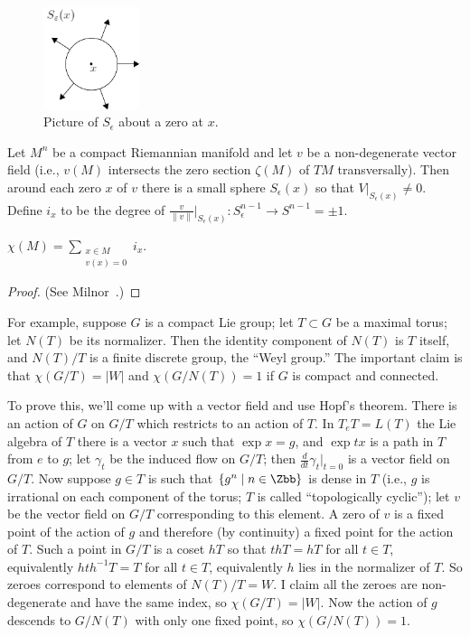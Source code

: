 \begin{figure}
\centering\includegraphics[width=0.25\textwidth]{figures/figure39.pdf}
\caption{\small Picture of $S_\epsilon$ about a zero at $x$.}
\end{figure}
Let $M^n$ be a compact Riemannian manifold and let $v$ be a non-degenerate vector field (i.e., $v(M)$ intersects the zero section $\zeta(M)$ of $TM$ transversally).  Then around each zero $x$ of $v$ there is a small sphere $S_\epsilon(x)$ so that $V|_{S_\epsilon(x)} \ne 0$.  Define $i_x$ to be the degree of $\frac{v}{\|v\|}|_{S_\epsilon(x)}: S^{n-1}_\epsilon \to S^{n-1} = \pm 1$.
\begin{thm}[Hopf]
$\chi(M) = \sum_{\substack{x \in M \\ v(x) = 0}} i_x$.
\end{thm}
\begin{proof}
(See Milnor~\cite{Milnor}.)
\end{proof}
For example, suppose $G$ is a compact Lie group; let $T \subset G$ be a maximal torus; let $N(T)$ be its normalizer.  Then the identity component of $N(T)$ is $T$ itself, and $N(T) / T$ is a finite discrete group, the ``Weyl group.''  The important claim is that $\chi(G / T) = |W|$ and $\chi(G / N(T)) = 1$ if $G$ is compact and connected.

To prove this, we'll come up with a vector field and use Hopf's theorem.  There is an action of $G$ on $G/T$ which restricts to an action of $T$.  In $T_eT = L(T)$ the Lie algebra of $T$ there is a vector $x$ such that $\exp x = g$, and $\exp tx$ is a path in $T$ from $e$ to $g$; let $\gamma_t$ be the induced flow on $G/T$; then $\frac{d}{dt} \gamma_t |_{t = 0}$ is a vector field on $G/T$.  Now suppose $g \in T$ is such that $\{g^n \mid n \in \Zbb\}$ is dense in $T$ (i.e., $g$ is irrational on each component of the torus; $T$ is called ``topologically cyclic''); let $v$ be the vector field on $G/T$ corresponding to this element.  A zero of $v$ is a fixed point of the action of $g$ and therefore (by continuity) a fixed point for the action of $T$.  Such a point in $G/T$ is a coset $hT$ so that $thT = hT$ for all $t \in T$, equivalently $hth^{-1} T = T$ for all $t \in T$, equivalently $h$ lies in the normalizer of $T$.  So zeroes correspond to elements of $N(T) / T = W$.  I claim all the zeroes are non-degenerate and have the same index, so $\chi(G/T) = |W|$.  Now the action of $g$ descends to $G/N(T)$ with only one fixed point, so $\chi(G/N(T)) = 1$.

